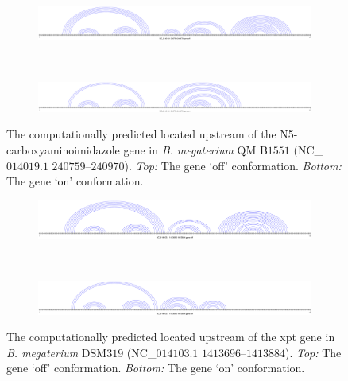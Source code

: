 \begin{figure}[!ht]
\centering
\begin{subfigure}[h]{\textwidth}
\centering
\includegraphics[width=.9\textwidth]{Figures/Ribofinder/NC_014019_1_240759_240970_OFF.pdf}
\end{subfigure} \\
\medskip
\begin{subfigure}[h]{\textwidth}
\centering
\includegraphics[width=.9\textwidth]{Figures/Ribofinder/NC_014019_1_240759_240970_ON.pdf}
\end{subfigure}
\caption[Structures for the putative \rb located upstream of the N5-carboxy\-amino\-imidazole gene in {\em B. megaterium} QM B$1551$]{The computationally predicted \rb located upstream of the
N5-carboxy\-amino\-imidazole
gene in {\em B. megaterium} QM B$1551$ (NC\_$014019.1$ $240759$--$240970$).
{\em Top:} The gene `off' conformation. {\em Bottom:} The gene `on' conformation.}
\label{fig:figure:NC_014019_1_240759_240970}
\end{figure}
\medskip

\begin{figure}[!ht]
\centering
\begin{subfigure}[h]{\textwidth}
\centering
\includegraphics[width=.9\textwidth]{Figures/Ribofinder/NC_014103_1_1413696_1413884_OFF.pdf}
\end{subfigure} \\
\medskip
\begin{subfigure}[h]{\textwidth}
\centering
\includegraphics[width=.9\textwidth]{Figures/Ribofinder/NC_014103_1_1413696_1413884_ON.pdf}
\end{subfigure}
\caption[Structures for the putative \rb located upstream of the xpt gene in {\em B. megaterium} DSM$319$]{The computationally predicted \rb located upstream of the xpt
gene in {\em B. megaterium} DSM$319$ (NC\_$014103.1$ $1413696$--$1413884$).
{\em Top:} The gene `off' conformation. {\em Bottom:} The gene `on' conformation.}
\label{fig:figure:NC_014103_1_1413696_1413884}
\end{figure}
\medskip

